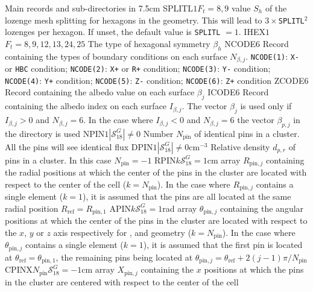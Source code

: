 \begin{DescriptionEnregistrement}{Main records and sub-directories in }{7.5cm}
\OptIntEnr
  {SPLITL}{$1$}{$F_{t}=8,9$}
  {value $S_{h}$ of the lozenge mesh splitting for hexagons in the geometry. This will lead to $3 \times${\tt SPLITL}$^2$ lozenges per hexagon. If unset, the default value is {\tt SPLITL} $=1$.}
\OptIntEnr
  {IHEX}{$1$}{$F_{t}= 8,9,12,13,24,25$}
  {The type of hexagonal symmetry $\beta_{h}$}
\IntEnr
  {NCODE}{$6$}
  {Record containing the types of boundary conditions on each surface
  $N_{\beta,j}$. {\tt NCODE(1)}: {\tt X-} or {\tt HBC} condition;
  {\tt NCODE(2)}: {\tt X+} or {\tt R+} condition; {\tt NCODE(3)}: {\tt Y-}
  condition; {\tt NCODE(4)}: {\tt Y+} condition; {\tt NCODE(5)}: {\tt Z-}
  condition; {\tt NCODE(6)}: {\tt Z+} condition}
\RealEnr
  {ZCODE}{$6$}{}
  {Record containing the albedo value on each surface $\beta_{j}$}
\IntEnr
  {ICODE}{$6$}
  {Record containing the albedo index on each surface $I_{\beta,j}$. 
   The vector $\beta_{j}$ is used only if $I_{\beta,j}>0$ and $N_{\beta,j}=6$. In the case where
   $I_{\beta,j}<0$ and $N_{\beta,j}=6$ the
   vector $\beta_{p,j}$ in the directory  is used} 
\OptIntEnr
  {NPIN}{$1$}{$|\mathcal{S}^{G}_{18}|\ne 0$}
  {Number $N_{\text{pin}}$ of identical pins in a cluster. All the pins will see identical flux}
\OptRealEnr
  {DPIN}{$1$}{$|\mathcal{S}^{G}_{18}|\ne 0$}{cm$^{-3}$}
  {Relative density $d_{p,r}$ of pins in a cluster. In this case $N_{\text{pin}}=-1$}
\OptRealEnr
  {RPIN}{$k$}{$\mathcal{S}^{G}_{18}=1$}{cm}
  {array $R_{\text{pin},j}$ containing the radial positions at which the center of the pins in the cluster are located with respect to the center of the cell ($k=N_{\text{pin}}$). In the case where
   $R_{\text{pin},j}$ contains a single element ($k=1$), it is assumed that the pins are all located at the same radial position $R_{\text{ref}}=R_{\text{pin},1}$}
\OptRealEnr
  {APIN}{$k$}{$\mathcal{S}^{G}_{18}=1$}{rad}
  {array $\theta_{\text{pin},j}$ containing the angular positions at which the center of the pins in the cluster are located with respect to the $x$, $y$ or $z$ axis
respectively for ,  and  geometry ($k=N_{\text{pin}}$). In the case where
   $\theta_{\text{pin},j}$ contains a single element ($k=1$), it is assumed that the first pin is located at $\theta_{\text{ref}}=\theta_{\text{pin},1}$, the remaining pins being located at
$\theta_{\text{pin},j}=\theta_{\text{ref}}+2(j-1)\pi/N_{\text{pin}}$}
\OptRealEnr
  {CPINX}{$N_{\text{pin}}$}{$\mathcal{S}^{G}_{18}=-1$}{cm}
  {array $X_{\text{pin},j}$ containing the $x$ positions at which the pins in the cluster are centered with respect to the center of the cell}

\end{DescriptionEnregistrement}
